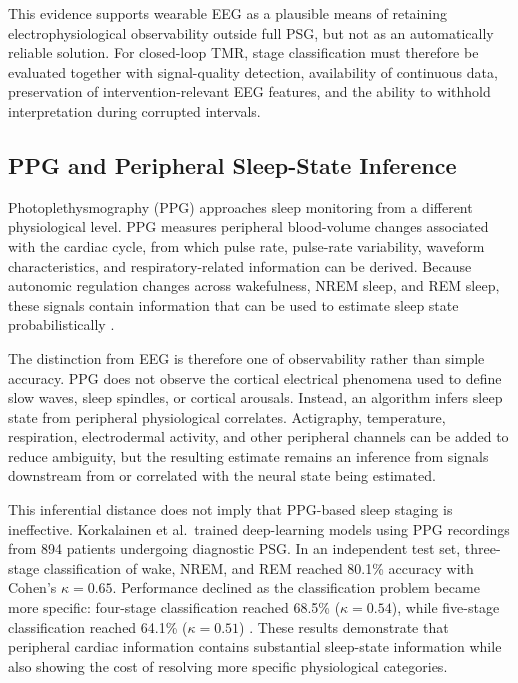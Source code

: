 This evidence supports wearable EEG as a plausible means of retaining
electrophysiological observability outside full PSG, but not as an automatically
reliable solution. For closed-loop TMR, stage classification must therefore be
evaluated together with signal-quality detection, availability of continuous
data, preservation of intervention-relevant EEG features, and the ability to
withhold interpretation during corrupted intervals.


\subsection{PPG and Peripheral Sleep-State Inference}

Photoplethysmography (PPG) approaches sleep monitoring from a different
physiological level. PPG measures peripheral blood-volume changes associated
with the cardiac cycle, from which pulse rate, pulse-rate variability, waveform
characteristics, and respiratory-related information can be derived. Because
autonomic regulation changes across wakefulness, NREM sleep, and REM sleep,
these signals contain information that can be used to estimate sleep state
probabilistically \citep{dezambotti2019wearable}.

The distinction from EEG is therefore one of observability rather than simple
accuracy. PPG does not observe the cortical electrical phenomena used to define
slow waves, sleep spindles, or cortical arousals. Instead, an algorithm infers
sleep state from peripheral physiological correlates. Actigraphy, temperature,
respiration, electrodermal activity, and other peripheral channels can be added
to reduce ambiguity, but the resulting estimate remains an inference from
signals downstream from or correlated with the neural state being estimated.

This inferential distance does not imply that PPG-based sleep staging is
ineffective. Korkalainen et al.\ trained deep-learning models using PPG
recordings from 894 patients undergoing diagnostic PSG. In an independent test
set, three-stage classification of wake, NREM, and REM reached 80.1\% accuracy
with Cohen's \(\kappa=0.65\). Performance declined as the classification problem
became more specific: four-stage classification reached 68.5\%
(\(\kappa=0.54\)), while five-stage classification reached 64.1\%
(\(\kappa=0.51\))
\citep{korkalainen2020ppg}. These results demonstrate that peripheral cardiac
information contains substantial sleep-state information while also showing the
cost of resolving more specific physiological categories.

